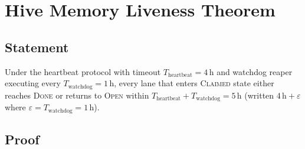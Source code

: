 
\section{Hive Memory Liveness Theorem}
\label{sec:K-liveness}

\subsection{Statement}
\label{ssec:K-liveness-statement}

\begin{theorem}
\label{thm:K-liveness}
Under the heartbeat protocol with timeout $T_{\text{heartbeat}} = 4\,\text{h}$
and watchdog reaper executing every $T_{\text{watchdog}} = 1\,\text{h}$,
every lane that enters \textsc{Claimed} state either reaches
\textsc{Done} or returns to \textsc{Open} within
$T_{\text{heartbeat}} + T_{\text{watchdog}} = 5\,\text{h}$
(written $4\,\text{h} + \varepsilon$ where
$\varepsilon = T_{\text{watchdog}} = 1\,\text{h}$).
\end{theorem}

\subsection{Proof}
\label{ssec:K-liveness-proof}

